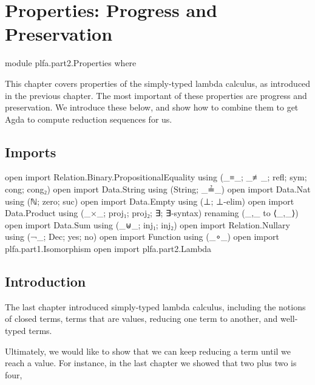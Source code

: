 \hypertarget{Properties}{%
\chapter{Properties: Progress and Preservation}\label{Properties}}

\begin{fence}
\begin{code}
module plfa.part2.Properties where
\end{code}
\end{fence}

This chapter covers properties of the simply-typed lambda calculus, as
introduced in the previous chapter. The most important of these
properties are progress and preservation. We introduce these below, and
show how to combine them to get Agda to compute reduction sequences for
us.

\hypertarget{imports}{%
\section{Imports}\label{imports}}

\begin{fence}
\begin{code}
open import Relation.Binary.PropositionalEquality
  using (_≡_; _≢_; refl; sym; cong; cong₂)
open import Data.String using (String; _≟_)
open import Data.Nat using (ℕ; zero; suc)
open import Data.Empty using (⊥; ⊥-elim)
open import Data.Product
  using (_×_; proj₁; proj₂; ∃; ∃-syntax)
  renaming (_,_ to ⟨_,_⟩)
open import Data.Sum using (_⊎_; inj₁; inj₂)
open import Relation.Nullary using (¬_; Dec; yes; no)
open import Function using (_∘_)
open import plfa.part1.Isomorphism
open import plfa.part2.Lambda
\end{code}
\end{fence}

\hypertarget{introduction}{%
\section{Introduction}\label{introduction}}

The last chapter introduced simply-typed lambda calculus, including the
notions of closed terms, terms that are values, reducing one term to
another, and well-typed terms.

Ultimately, we would like to show that we can keep reducing a term until
we reach a value. For instance, in the last chapter we showed that two
plus two is four,

